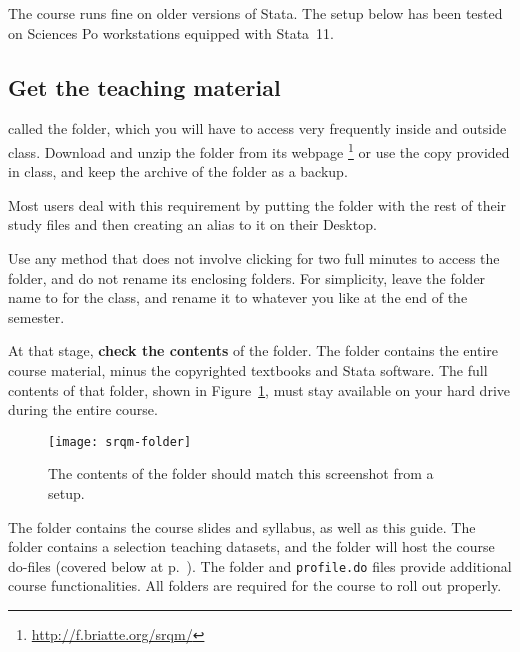 	The course runs fine on older versions of Stata. The setup below has been tested on Sciences Po workstations equipped with Stata~11.%
	
	\subsection{Get the teaching material}%
		\label{sec:teaching-pack}%

	 called the \SRQM folder, which you will have to access very frequently inside and outside class. Download and unzip the folder from its webpage%
		\footnote{\url{http://f.briatte.org/srqm/}} %
		or use the copy provided in class, and keep the \ZIP archive of the folder as a backup.%
		
	 Most users deal with this requirement by putting the \SRQM folder with the rest of their study files and then creating an alias to it on their Desktop.%
	
	Use any method that does not involve clicking for two full minutes to access the \SRQM folder, and do not rename its enclosing folders. For simplicity, leave the folder name to \SRQM for the class, and rename it to whatever you like at the end of the semester.%
	
	At that stage, \textbf{check the contents} of the \SRQM folder. The \SRQM folder contains the entire course material, minus the copyrighted textbooks and Stata software. The full contents of that folder, shown in Figure~\ref{fig:srqm-folder}, must stay available on your hard drive during the entire course.%

		\begin{figure}%
		  \texttt{[image: srqm-folder]}
      
		  \caption{The contents of the \SRQM folder should match %
			this screenshot from a \OSX setup.}
		  \label{fig:srqm-folder}
		\end{figure}
		
	The \course folder contains the course slides and syllabus, as well as this guide. The \data folder contains a selection teaching datasets, and the \code folder will host the course do-files (covered below at p.~\pageref{sec:do-files}). The \setup folder and \texttt{profile.do} files provide additional course functionalities. All folders are required for the course to roll out properly.%


